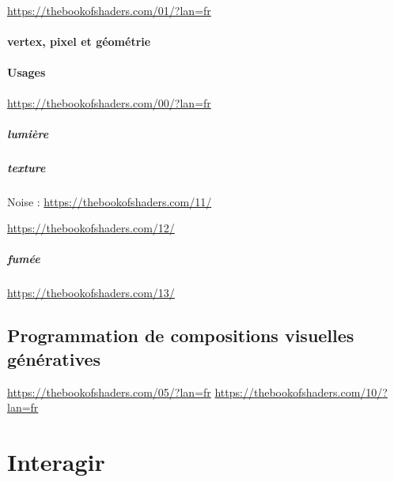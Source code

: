 \documentclass[
]{book}
\begin{document}
\url{https://thebookofshaders.com/01/?lan=fr}

\hypertarget{vertex-pixel-et-guxe9omuxe9trie}{%
\subsubsection{vertex, pixel et géométrie}\label{vertex-pixel-et-guxe9omuxe9trie}}

\hypertarget{usages}{%
\subsubsection{Usages}\label{usages}}

\url{https://thebookofshaders.com/00/?lan=fr}

\hypertarget{lumiuxe8re}{%
\paragraph{lumière}\label{lumiuxe8re}}

\hypertarget{texture-1}{%
\paragraph{texture}\label{texture-1}}

Noise : \url{https://thebookofshaders.com/11/}

\url{https://thebookofshaders.com/12/}

\hypertarget{fumuxe9e}{%
\paragraph{fumée}\label{fumuxe9e}}

\url{https://thebookofshaders.com/13/}

\hypertarget{programmation-de-compositions-visuelles-guxe9nuxe9ratives}{%
\section{Programmation de compositions visuelles génératives}\label{programmation-de-compositions-visuelles-guxe9nuxe9ratives}}

\url{https://thebookofshaders.com/05/?lan=fr}
\url{https://thebookofshaders.com/10/?lan=fr}

\hypertarget{interagir}{%
\chapter{Interagir}\label{interagir}}
\end{document}
